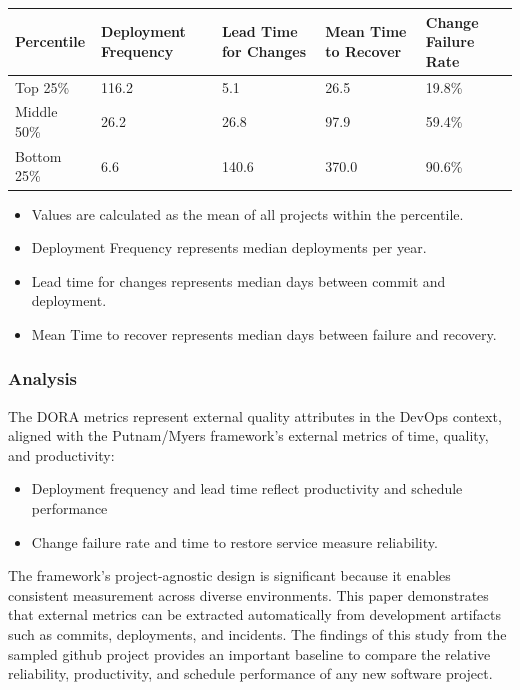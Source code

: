 \documentclass[12pt]{article}
\begin{document}
\begin{center}
	\begin{tabularx}{\textwidth} { |X|X|X|X|X|}
		\hline
		Percentile  & Deployment Frequency & Lead Time for Changes & Mean Time to Recover & Change Failure Rate \\
		\hline
		Top 25\%    & 116.2                & 5.1                   & 26.5                 & 19.8\% \\
		Middle 50\% & 26.2                 & 26.8                  & 97.9                 & 59.4\% \\
		Bottom 25\% & 6.6                  & 140.6                 & 370.0                & 90.6\% \\
		\hline
	\end{tabularx}
	\begin{itemize}
		\small
		\item Values are calculated as the mean of all projects within the percentile.
		\item Deployment Frequency represents median deployments per year.
		\item Lead time for changes represents median days between commit and deployment.
		\item Mean Time to recover represents median days between failure and recovery.
	\end{itemize}
\end{center}

\subsubsection{Analysis}
The DORA metrics represent external quality
attributes in the DevOps context, aligned with the Putnam/Myers
framework's external metrics of time, quality, and productivity:

\begin{itemize}
	\item Deployment frequency and lead time reflect productivity and schedule performance
	\item Change failure rate and time to restore service measure reliability.
\end{itemize}

The framework's project-agnostic design is significant because it enables
consistent measurement across diverse environments.
This paper demonstrates that external metrics can be extracted
automatically from development artifacts such as commits, deployments, and
incidents. The findings of this study from the sampled github project
provides an important baseline to compare the relative reliability, productivity,
and schedule performance of any new software project.
\end{document}
